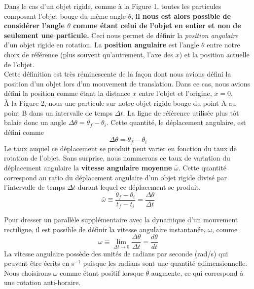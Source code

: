 \documentclass[titlepage,oneside,a4paper,11pt]{book} %
\begin{document}
Dans le cas d'un objet rigide, comme à la Figure 1, toutes les particules composant l'objet bouge du même angle $\theta$, \textbf{il nous est alors possible de considérer l'angle $\theta$ comme étant celui de l'objet en entier et non de seulement une particule.} Ceci nous permet de définir la \emph{position angulaire} d'un objet rigide en rotation. La \textbf{position angulaire} est l'angle $\theta$ entre notre choix de référence (plus souvent qu'autrement, l'axe des $x$) et la position actuelle de l'objet.\\

Cette définition est très réminescente de la façon dont nous avions défini la position d'un objet lors d'un mouvement de translation. Dans ce cas, nous avions défini la position comme étant la distance $x$ entre l'objet et l'origine, $x=0$.\\

À la Figure 2, nous une particule sur notre objet rigide bouge du point A au point B dans un intervalle de temps $\Delta t$. La ligne de référence utilisée plus tôt balaie donc un angle $\Delta \theta = \theta_f-\theta_i$. Cette quantité, le déplacement angulaire, est défini comme
\begin{equation*}
\Delta \theta = \theta_f-\theta_i
\end{equation*}
Le taux auquel ce déplacement se produit peut varier en fonction du taux de rotation de l'objet. Sans surprise, nous nommerons ce taux de variation du déplacement angulaire la \textbf{vitesse angulaire moyenne} $\bar{\omega}$. Cette quantité correspond au ratio du déplacement angulaire d'un objet rigide divisé par l'intervalle de temps $\Delta t$ durant lequel ce déplacement se produit.
\begin{equation}
\bar{\omega} \equiv \frac{\theta_f-\theta_i}{t_f-t_i}=\frac{\Delta \theta}{\Delta t}
\end{equation}

Pour dresser un parallèle supplémentaire avec la dynamique d'un mouvement rectiligne, il est possible de définir la vitesse angulaire instantanée, $\omega$, comme 
\begin{equation}
\omega \equiv \lim _{\Delta t \rightarrow 0} \frac{\Delta \theta}{\Delta t}=\frac{d \theta}{d t}
\label{eq:speed}
\end{equation}
La vitesse angulaire possède des unités de radians par seconde (rad/s) qui peuvent être écrits en s$^{-1}$ puisque les radians sont une quantité adimensionnelle. Nous choisirons $\omega$ comme étant positif lorsque $\theta$ augmente, ce qui correspond à une rotation anti-horaire.\\
\end{document}
